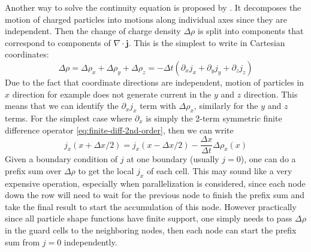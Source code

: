 Another way to solve the continuity equation is proposed by
\citet{esirkepov_exact_2001}. It decomposes the motion of charged particles into
motions along individual axes since they are independent. Then the change of
charge density $\Delta\rho$ is split into components that correspond to
components of $\nabla\cdot \mathbf{j}$. This is the simplest to write in
Cartesian coordinates:
\begin{equation}
  \label{eq:esirkepov-split}
  \Delta \rho = \Delta\rho_{x} + \Delta\rho_{y} + \Delta\rho_{z} = -\Delta t(\partial_{x}j_{x} + \partial_{y}j_{y} + \partial_{z}j_{z})
\end{equation}
Due to the fact that coordinate directions are independent, motion of particles
in $x$ direction for example does not generate current in the $y$ and $z$
direction. This means that we can identify the $\partial_{x}j_{x}$ term with
$\Delta \rho_{x}$, similarly for the $y$ and $z$ terms. For the simplest case
where $\partial_{x}$ is simply the 2-term symmetric finite difference operator
\ref{eq:finite-diff-2nd-order}, then we can write
\begin{equation}
  \label{eq:esirkepov-x-dir}
  j_{x}(x + \Delta x/2) = j_{x}(x - \Delta x/2) - \frac{\Delta x}{\Delta t}\Delta\rho_{x}(x)
\end{equation}
Given a boundary condition of $j$ at one boundary (usually $j = 0$), one can do
a prefix sum over $\Delta\rho$ to get the local $j_{x}$ of each cell. This may
sound like a very expensive operation, especially when parallelization is
considered, since each node down the row will need to wait for the previous node
to finish the prefix sum and take the final result to start the accumulation of
this node. However practically since all particle shape functions have finite
support, one simply needs to pass $\Delta\rho$ in the guard cells to the
neighboring nodes, then each node can start the prefix sum from $j = 0$
independently.


